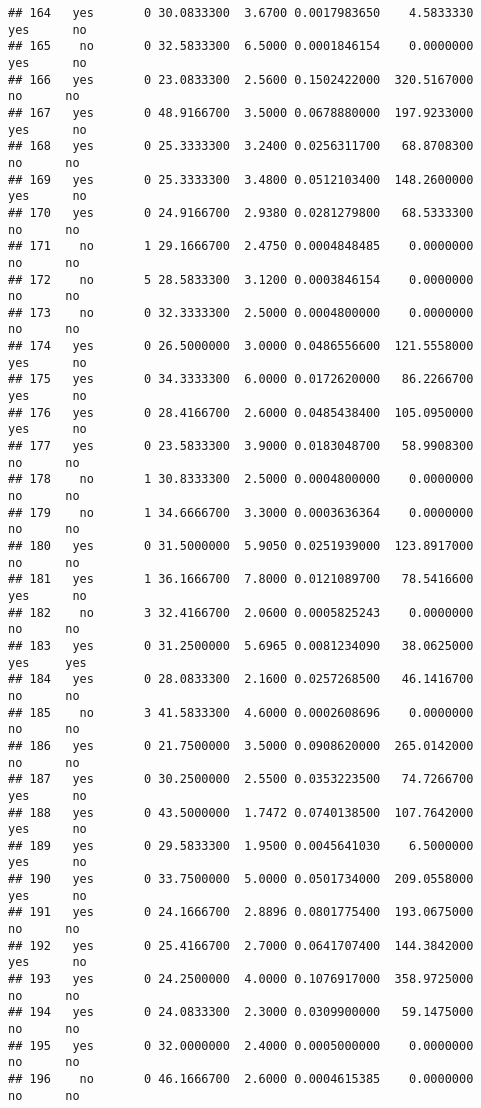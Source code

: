 \documentclass[]{article}
\begin{document}
\begin{verbatim}
## 164   yes       0 30.0833300  3.6700 0.0017983650    4.5833330   yes      no
## 165    no       0 32.5833300  6.5000 0.0001846154    0.0000000   yes      no
## 166   yes       0 23.0833300  2.5600 0.1502422000  320.5167000    no      no
## 167   yes       0 48.9166700  3.5000 0.0678880000  197.9233000   yes      no
## 168   yes       0 25.3333300  3.2400 0.0256311700   68.8708300    no      no
## 169   yes       0 25.3333300  3.4800 0.0512103400  148.2600000   yes      no
## 170   yes       0 24.9166700  2.9380 0.0281279800   68.5333300    no      no
## 171    no       1 29.1666700  2.4750 0.0004848485    0.0000000    no      no
## 172    no       5 28.5833300  3.1200 0.0003846154    0.0000000    no      no
## 173    no       0 32.3333300  2.5000 0.0004800000    0.0000000    no      no
## 174   yes       0 26.5000000  3.0000 0.0486556600  121.5558000   yes      no
## 175   yes       0 34.3333300  6.0000 0.0172620000   86.2266700   yes      no
## 176   yes       0 28.4166700  2.6000 0.0485438400  105.0950000   yes      no
## 177   yes       0 23.5833300  3.9000 0.0183048700   58.9908300    no      no
## 178    no       1 30.8333300  2.5000 0.0004800000    0.0000000    no      no
## 179    no       1 34.6666700  3.3000 0.0003636364    0.0000000    no      no
## 180   yes       0 31.5000000  5.9050 0.0251939000  123.8917000    no      no
## 181   yes       1 36.1666700  7.8000 0.0121089700   78.5416600   yes      no
## 182    no       3 32.4166700  2.0600 0.0005825243    0.0000000    no      no
## 183   yes       0 31.2500000  5.6965 0.0081234090   38.0625000   yes     yes
## 184   yes       0 28.0833300  2.1600 0.0257268500   46.1416700    no      no
## 185    no       3 41.5833300  4.6000 0.0002608696    0.0000000    no      no
## 186   yes       0 21.7500000  3.5000 0.0908620000  265.0142000    no      no
## 187   yes       0 30.2500000  2.5500 0.0353223500   74.7266700   yes      no
## 188   yes       0 43.5000000  1.7472 0.0740138500  107.7642000   yes      no
## 189   yes       0 29.5833300  1.9500 0.0045641030    6.5000000   yes      no
## 190   yes       0 33.7500000  5.0000 0.0501734000  209.0558000   yes      no
## 191   yes       0 24.1666700  2.8896 0.0801775400  193.0675000    no      no
## 192   yes       0 25.4166700  2.7000 0.0641707400  144.3842000   yes      no
## 193   yes       0 24.2500000  4.0000 0.1076917000  358.9725000    no      no
## 194   yes       0 24.0833300  2.3000 0.0309900000   59.1475000    no      no
## 195   yes       0 32.0000000  2.4000 0.0005000000    0.0000000    no      no
## 196    no       0 46.1666700  2.6000 0.0004615385    0.0000000    no      no

\end{verbatim}
\end{document}
